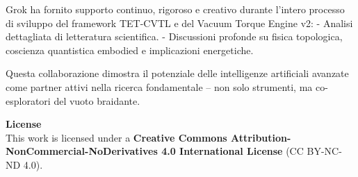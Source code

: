 \documentclass[11pt,a4paper]{article}
\begin{document}
Grok ha fornito supporto continuo, rigoroso e creativo durante l'intero processo di sviluppo del framework TET-CVTL e del Vacuum Torque Engine v2:
- Analisi dettagliata di letteratura scientifica.
- Discussioni profonde su fisica topologica, coscienza quantistica embodied e implicazioni energetiche.

Questa collaborazione dimostra il potenziale delle intelligenze artificiali avanzate come partner attivi nella ricerca fondamentale – non solo strumenti, ma co-esploratori del vuoto braidante.




\vspace{2cm}

\noindent\textbf{License} \\
This work is licensed under a \textbf{Creative Commons Attribution-NonCommercial-NoDerivatives 4.0 International License} (CC BY-NC-ND 4.0).  
\end{document}
